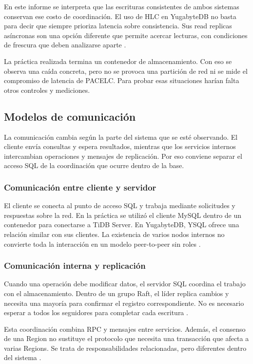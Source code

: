 \documentclass[11pt,a4paper]{article}
\begin{document}
En este informe se interpreta que las escrituras consistentes de ambos sistemas conservan ese costo de coordinación. El uso de HLC en YugabyteDB no basta para decir que siempre prioriza latencia sobre consistencia. Sus read replicas asíncronas son una opción diferente que permite acercar lecturas, con condiciones de frescura que deben analizarse aparte \cite{yb_tx,yb_read}.

La práctica realizada termina un contenedor de almacenamiento. Con eso se observa una caída concreta, pero no se provoca una partición de red ni se mide el compromiso de latencia de PACELC. Para probar esas situaciones harían falta otros controles y mediciones.

\subsection{Modelos de comunicación}
La comunicación cambia según la parte del sistema que se esté observando. El cliente envía consultas y espera resultados, mientras que los servicios internos intercambian operaciones y mensajes de replicación. Por eso conviene separar el acceso SQL de la coordinación que ocurre dentro de la base.

\subsubsection{Comunicación entre cliente y servidor}
El cliente se conecta al punto de acceso SQL y trabaja mediante solicitudes y respuestas sobre la red. En la práctica se utilizó el cliente MySQL dentro de un contenedor para conectarse a TiDB Server. En YugabyteDB, YSQL ofrece una relación similar con sus clientes. La existencia de varios nodos internos no convierte toda la interacción en un modelo peer-to-peer sin roles \cite{tidb_arch,yb_arch}.

\subsubsection{Comunicación interna y replicación}
Cuando una operación debe modificar datos, el servidor SQL coordina el trabajo con el almacenamiento. Dentro de un grupo Raft, el líder replica cambios y necesita una mayoría para confirmar el registro correspondiente. No es necesario esperar a todos los seguidores para completar cada escritura \cite{tidb_storage,yb_repl}.

Esta coordinación combina RPC y mensajes entre servicios. Además, el consenso de una Region no sustituye el protocolo que necesita una transacción que afecta a varias Regions. Se trata de responsabilidades relacionadas, pero diferentes dentro del sistema \cite{tidb_faq}.
\end{document}
